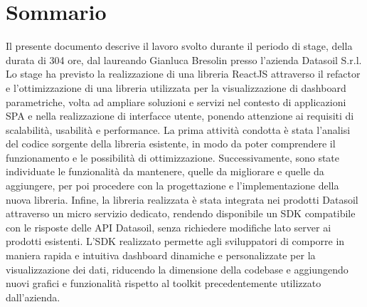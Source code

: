 \cleardoublepage
{}
{}
\begingroup
\let\clearpage\relax
\let\cleardoublepage\relax
\chapter*{Sommario}

Il presente documento descrive il lavoro svolto durante il periodo di stage, della durata di 304 ore, dal laureando Gianluca Bresolin
presso l'azienda Datasoil S.r.l. Lo stage ha previsto la realizzazione di una libreria ReactJS attraverso il refactor
e l'ottimizzazione di una libreria utilizzata per la visualizzazione di dashboard parametriche, volta ad ampliare soluzioni e servizi
nel contesto di applicazioni SPA e nella realizzazione di interfacce utente, ponendo attenzione ai requisiti di scalabilità,
usabilità e performance. \newline
La prima attività condotta è stata l'analisi del codice sorgente della libreria esistente, in modo da poter comprendere il funzionamento e le possibilità
di ottimizzazione. Successivamente, sono state individuate le funzionalità da mantenere, quelle da migliorare e quelle da aggiungere,
per poi procedere con la progettazione e l'implementazione della nuova libreria. \newline
Infine, la libreria realizzata è stata integrata nei prodotti Datasoil attraverso un micro servizio dedicato, rendendo disponibile un SDK
compatibile con le risposte delle API Datasoil, senza richiedere modifiche lato server ai prodotti esistenti. \newline
L'SDK realizzato permette agli sviluppatori di comporre in maniera rapida e intuitiva dashboard
dinamiche e personalizzate per la visualizzazione dei dati, riducendo la dimensione della codebase e aggiungendo nuovi grafici e funzionalità
rispetto al toolkit precedentemente utilizzato dall'azienda.


\endgroup
\vfill

